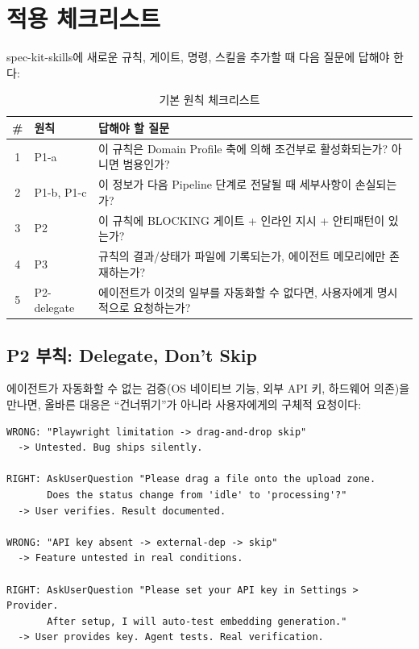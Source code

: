 \documentclass[11pt,a4paper,openright,twoside]{report}
\begin{document}
\section{적용 체크리스트}

spec-kit-skills에 새로운 규칙, 게이트, 명령, 스킬을 추가할 때 다음 질문에 답해야 한다:

\begin{table}[H]
\centering
\caption{기본 원칙 체크리스트}
\label{tab:principle-checklist}
\begin{tabularx}{\textwidth}{clX}
\toprule
\textbf{\#} & \textbf{원칙} & \textbf{답해야 할 질문} \\
\midrule
1 & P1-a & 이 규칙은 Domain Profile 축에 의해 조건부로 활성화되는가? 아니면 범용인가? \\
2 & P1-b, P1-c & 이 정보가 다음 Pipeline 단계로 전달될 때 세부사항이 손실되는가? \\
3 & P2 & 이 규칙에 BLOCKING 게이트 + 인라인 지시 + 안티패턴이 있는가? \\
4 & P3 & 규칙의 결과/상태가 파일에 기록되는가, 에이전트 메모리에만 존재하는가? \\
5 & P2-delegate & 에이전트가 이것의 일부를 자동화할 수 없다면, 사용자에게 명시적으로 요청하는가? \\
\bottomrule
\end{tabularx}
\end{table}

\subsection{P2 부칙: Delegate, Don't Skip}

에이전트가 자동화할 수 없는 검증(OS 네이티브 기능, 외부 API 키, 하드웨어 의존)을 만나면, 올바른 대응은 ``건너뛰기''가 아니라 사용자에게의 구체적 요청이다:

\begin{lstlisting}[title={Delegation Examples}]
WRONG: "Playwright limitation -> drag-and-drop skip"
  -> Untested. Bug ships silently.

RIGHT: AskUserQuestion "Please drag a file onto the upload zone.
       Does the status change from 'idle' to 'processing'?"
  -> User verifies. Result documented.

WRONG: "API key absent -> external-dep -> skip"
  -> Feature untested in real conditions.

RIGHT: AskUserQuestion "Please set your API key in Settings > Provider.
       After setup, I will auto-test embedding generation."
  -> User provides key. Agent tests. Real verification.
\end{lstlisting}
\end{document}

